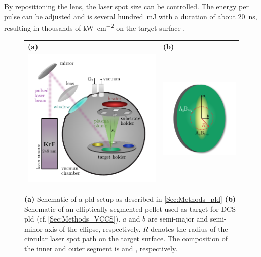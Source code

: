 By repositioning the lens, the laser spot size can be controlled.
The energy per pulse can be adjusted and is several hundred~\unit{\mJ} with a duration of about \qty{20}{\ns}, resulting in thousands of \unit{\kW\per\square\cm} on the target surface
    \cite{lorenz2019}.
\begin{figure}
    \centering
    \begin{tabular}{ll}
        \textbf{(a)}&\textbf{(b)}\\
        \includegraphics[width=9cm,align=c]{fastImages/PLD.pdf}&
        \includegraphics[width=5cm,align=c]{fastImages/target.pdf}  
    \end{tabular}
    \caption{\textbf{(a)} Schematic of a \gls{pld} setup as described in \ref{Sec:Methods_pld} \textbf{(b)} Schematic of an elliptically segmented pellet used as target for \acrshort{DCS}-\gls{pld} (cf.\,\ref{Sec:Methods_VCCS}).
    $a$ and $b$ are semi-major and semi-minor axis of the ellipse, respectively.
    $R$ denotes the radius of the circular laser spot path on the target surface.
    The composition of the inner and outer segment is  and , respectively.}
    \label{Fig:Methods_pld}
\end{figure}

